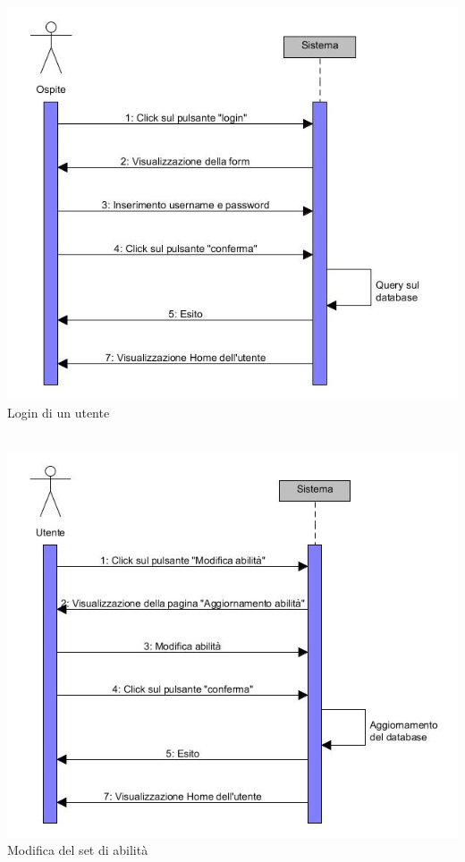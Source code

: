 \documentclass[a4paper,12pt]{article}
\begin{document}
\begin{center}
\includegraphics[scale=0.6]{sDiagrams/login.jpg} \\
\caption{Login di un utente} \\
\vspace*{\fill}
\includegraphics[scale=0.6]{sDiagrams/modificaAbilita.jpg} \\
\caption{Modifica del set di abilità} \\
\clearpage

\end{center}
\end{document}
